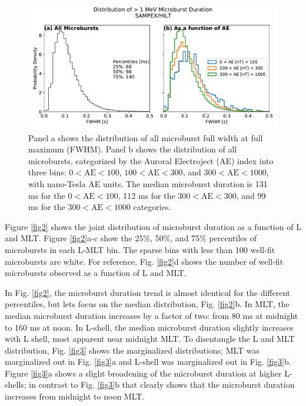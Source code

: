 \documentclass[draft]{agujournal2019}
\begin{document}
\begin{figure}
\noindent\includegraphics[width=\textwidth]{figures/figX.pdf}
\caption{Panel a shows the distribution of all microburst full width at full maximum (FWHM). Panel b shows the distribution of all microbursts, categorized by the Auroral Electroject (AE) index into three bins: $0 < \mathrm{AE} < 100$, $100 < \mathrm{AE} < 300$, and $300 < \mathrm{AE} < 1000$, with nano-Tesla AE units. The median microburst duration is 131 ms for the $0 < \mathrm{AE} < 100$, 112 ms for the $300 < \mathrm{AE} < 300$, and 99 ms for the $300 < \mathrm{AE} < 1000$ categories.}
\label{figX}
\end{figure}

Figure \ref{fig2} shows the joint distribution of microburst duration as a function of L and MLT. Figure \ref{fig2}a-c show the 25\%, 50\%, and 75\% percentiles of microbursts in each L-MLT bin. The sparse bins with less than 100 well-fit microbursts are white. For reference, Fig. \ref{fig2}d shows the number of well-fit microbursts observed as a function of L and MLT.

In Fig. \ref{fig2}, the microburst duration trend is almost identical for the different percentiles, but lets focus on the median distribution, Fig. \ref{fig2}b. In MLT, the median microburst duration increases by a factor of two: from 80 ms at midnight to 160 ms at noon. In L-shell, the median microburst duration slightly increases with L shell, most apparent near midnight MLT. To disentangle the L and MLT distribution, Fig. \ref{fig3} shows the marginalized distributions; MLT was marginalized out in Fig. \ref{fig3}a and L-shell was marginalized out in Fig. \ref{fig3}b. Figure \ref{fig3}a shows a slight broadening of the microburst duration at higher L-shells; in contrast to Fig. \ref{fig3}b that clearly shows that the microburst duration increases from midnight to noon MLT.
\end{document}
